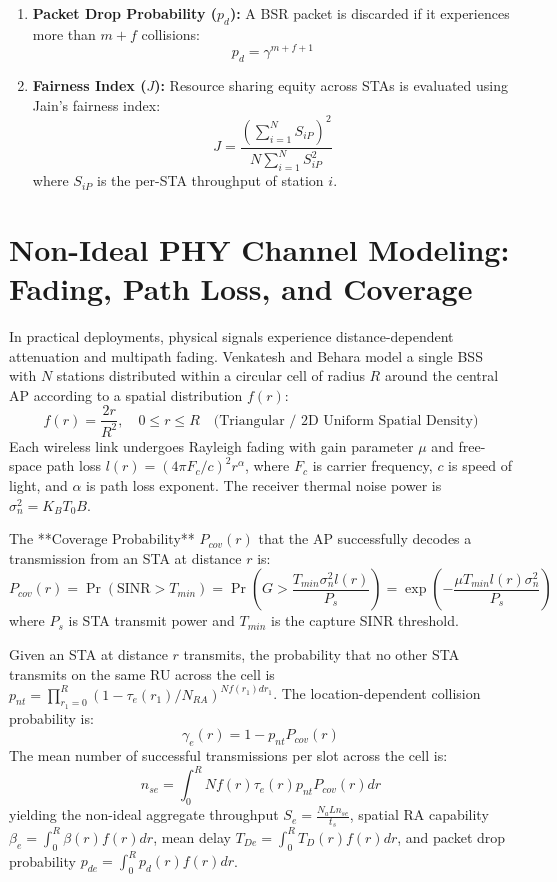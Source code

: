 \begin{enumerate}
    \item \textbf{Packet Drop Probability ($p_d$):} A BSR packet is discarded if it experiences more than $m+f$ collisions:
    \begin{equation}
        p_d = \gamma^{m+f+1}
    \end{equation}
    
    \item \textbf{Fairness Index ($J$):} Resource sharing equity across STAs is evaluated using Jain's fairness index:
    \begin{equation}
        J = \frac{\left(\sum_{i=1}^N S_{iP}\right)^2}{N \sum_{i=1}^N S_{iP}^2}
    \end{equation}
    where $S_{iP}$ is the per-STA throughput of station $i$.
\end{enumerate}

\section{Non-Ideal PHY Channel Modeling: Fading, Path Loss, and Coverage}
In practical deployments, physical signals experience distance-dependent attenuation and multipath fading. Venkatesh and Behara model a single BSS with $N$ stations distributed within a circular cell of radius $R$ around the central AP according to a spatial distribution $f(r)$:
\begin{equation}
    f(r) = \frac{2r}{R^2}, \quad 0 \le r \le R \quad \text{(Triangular / 2D Uniform Spatial Density)}
\end{equation}
Each wireless link undergoes Rayleigh fading with gain parameter $\mu$ and free-space path loss $l(r) = (4\pi F_c / c)^2 r^\alpha$, where $F_c$ is carrier frequency, $c$ is speed of light, and $\alpha$ is path loss exponent. The receiver thermal noise power is $\sigma_n^2 = K_B T_0 B$.

The **Coverage Probability** $P_{cov}(r)$ that the AP successfully decodes a transmission from an STA at distance $r$ is:
\begin{equation}
    P_{cov}(r) = \Pr(\text{SINR} > T_{min}) = \Pr\left( G > \frac{T_{min} \sigma_n^2 l(r)}{P_s} \right) = \exp\left( -\frac{\mu T_{min} l(r) \sigma_n^2}{P_s} \right)
\end{equation}
where $P_s$ is STA transmit power and $T_{min}$ is the capture SINR threshold.

Given an STA at distance $r$ transmits, the probability that no other STA transmits on the same RU across the cell is $p_{nt} = \prod_{r_1=0}^R (1 - \tau_e(r_1)/N_{RA})^{N f(r_1) dr_1}$. The location-dependent collision probability is:
\begin{equation}
    \gamma_e(r) = 1 - p_{nt} P_{cov}(r)
\end{equation}
The mean number of successful transmissions per slot across the cell is:
\begin{equation}
    n_{se} = \int_0^R N f(r) \tau_e(r) p_{nt} P_{cov}(r) dr
\end{equation}
yielding the non-ideal aggregate throughput $S_e = \frac{N_a L n_{se}}{t_s}$, spatial RA capability $\beta_e = \int_0^R \beta(r) f(r) dr$, mean delay $T_{De} = \int_0^R T_D(r) f(r) dr$, and packet drop probability $p_{de} = \int_0^R p_d(r) f(r) dr$.

